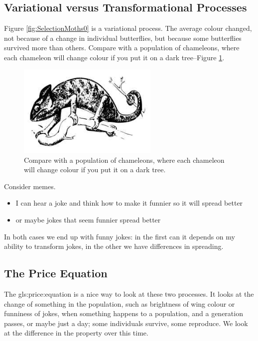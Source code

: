 \documentclass[]{article}
\begin{document}
\subsection{Variational versus Transformational Processes}
Figure \ref{fig:SelectionMoths0} is a variational process. The average colour changed, not because of a change in individual butterflies, but because some butterflies survived more than others. Compare with a population of chameleons, where each chameleon will change colour if you put it on a dark tree--Figure \ref{fig:chamelion}.
\begin{figure}[H]
	\begin{center}
		\caption[ Compare with a population of chameleons]{ Compare with a population of chameleons, where each chameleon will change colour if you put it on a dark tree.}\label{fig:chamelion}
		\includegraphics[width=0.6\textwidth]{chamelion}
	\end{center}
\end{figure}

Consider memes.
\begin{itemize}
	\item I can hear a joke and think how to make it funnier so it will spread better
	\item or maybe jokes that seem funnier spread better
\end{itemize}

In both cases we end up with funny jokes: in the first can it depends on my ability to transform jokes, in the other we have differences in spreading.

\subsection{The Price Equation}

The \gls{gls:price:equation}\cite{price1970selection} is a nice way to look at these two processes. It looks at the change of something in the population, such as brightness of wing colour or funniness of jokes,  when something happens to a population, and a generation passes, or maybe just a day; some individuals survive, some reproduce. We look at the difference in the property over this time.
\end{document}
